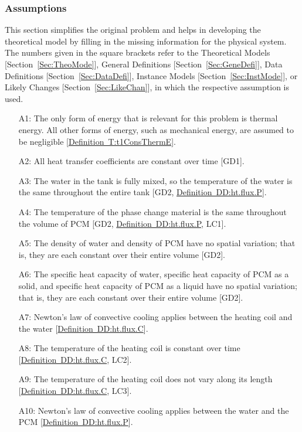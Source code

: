 \documentclass[12pt]{article}
\begin{document}
\subsubsection{Assumptions}
\label{Sec:Assu}
This section simplifies the original problem and helps in developing the theoretical model by filling in the missing information for the physical system. The numbers given in the square brackets refer to the Theoretical Models [Section~\ref{Sec:TheoMode}], General Definitions [Section~\ref{Sec:GeneDefi}], Data Definitions [Section~\ref{Sec:DataDefi}], Instance Models [Section~\ref{Sec:InstMode}], or Likely Changes [Section~\ref{Sec:LikeChan}], in which the respective assumption is used.
\begin{itemize}
\item[A1:]The only form of energy that is relevant for this problem is thermal energy. All other forms of energy, such as mechanical energy, are assumed to be negligible [\hyperref[T:t1ConsThermE]{Definition~T:t1ConsThermE}].
\item[A2:]All heat transfer coefficients are constant over time [GD1].
\item[A3:]The water in the tank is fully mixed, so the temperature of the water is the same throughout the entire tank [GD2, \hyperref[DD:ht.flux.P]{Definition~DD:ht.flux.P}].
\item[A4:]The temperature of the phase change material is the same throughout the volume of PCM [GD2, \hyperref[DD:ht.flux.P]{Definition~DD:ht.flux.P}, LC1].
\item[A5:]The density of water and density of PCM have no spatial variation; that is, they are each constant over their entire volume [GD2].
\item[A6:]The specific heat capacity of water, specific heat capacity of PCM as a solid, and specific heat capacity of PCM as a liquid have no spatial variation; that is, they are each constant over their entire volume [GD2].
\item[A7:]Newton's law of convective cooling applies between the heating coil and the water [\hyperref[DD:ht.flux.C]{Definition~DD:ht.flux.C}].
\item[A8:]The temperature of the heating coil is constant over time [\hyperref[DD:ht.flux.C]{Definition~DD:ht.flux.C}, LC2].
\item[A9:]The temperature of the heating coil does not vary along its length [\hyperref[DD:ht.flux.C]{Definition~DD:ht.flux.C}, LC3].
\item[A10:]Newton's law of convective cooling applies between the water and the PCM [\hyperref[DD:ht.flux.P]{Definition~DD:ht.flux.P}].

\end{itemize}
\end{document}
